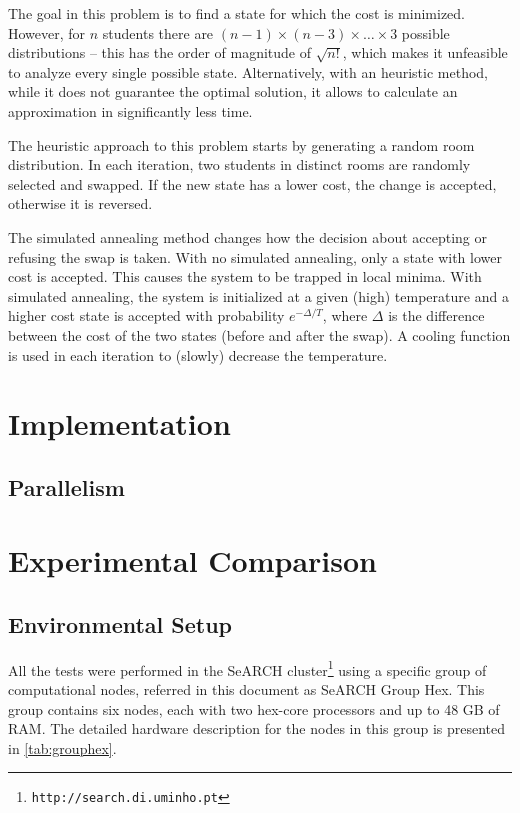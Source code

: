 \documentclass[abstract=on,9pt,twocolumn]{scrartcl}
\begin{document}
The goal in this problem is to find a state for which the cost is minimized. However, for $n$ students there are $(n-1)\times (n-3)\times\ldots\times 3$ possible distributions -- this has the order of magnitude of $\sqrt{n!}$, which makes it unfeasible to analyze every single possible state. Alternatively, with an heuristic method, while it does not guarantee the optimal solution, it allows to calculate an approximation in significantly less time.

The heuristic approach to this problem starts by generating a random room distribution. In each iteration, two students in distinct rooms are randomly selected and swapped. If the new state has a lower cost, the change is accepted, otherwise it is reversed.

The simulated annealing method changes how the decision about accepting or refusing the swap is taken. With no simulated annealing, only a state with lower cost is accepted. This causes the system to be trapped in local minima. With simulated annealing, the system is initialized at a given (high) temperature and a higher cost state is accepted with probability $e^{-\Delta/T}$, where $\Delta$ is the difference between the cost of the two states (before and after the swap). A cooling function is used in each iteration to (slowly) decrease the temperature.

\section{Implementation}

\subsection{Parallelism}

\section{Experimental Comparison}

\subsection{Environmental Setup}
All the tests were performed in the SeARCH cluster\footnote{\texttt{http://search.di.uminho.pt}} using a specific group of computational nodes, referred in this document as SeARCH Group Hex. This group contains six nodes, each with two hex-core processors and up to 48 GB of RAM. The detailed hardware description for the nodes in this group is presented in \cref{tab:grouphex}.
\end{document}
